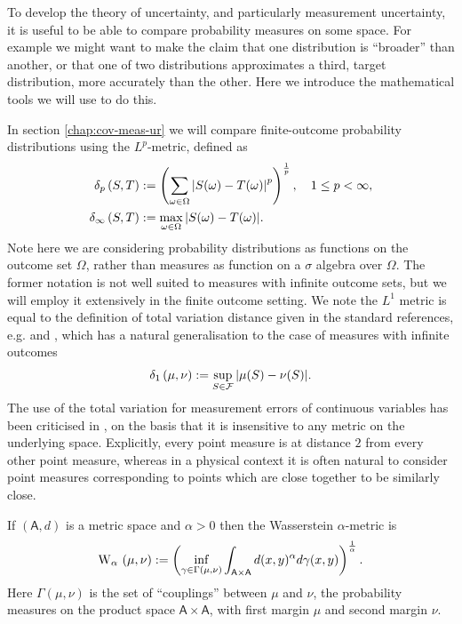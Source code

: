 To develop the theory of uncertainty, and particularly measurement uncertainty, it is useful to be able to compare probability measures on some space. For example we might want to make the claim that one distribution is ``broader'' than another, or that one of two distributions approximates a third, target distribution, more accurately than the other. Here we introduce the mathematical tools we will use to do this.

In section \ref{chap:cov-meas-ur} we will compare finite-outcome probability distributions using the $L^p$-metric, defined as
\begin{align}
  \label{eqn:lpvar-defn}
  \lPVar{S}{T}[p]&\defeq \left(\sum_{\omega\in\Omega} \abs{S(\omega) - T(\omega)}^p\right)^\frac{1}{p}, \quad 1\leq p < \infty,\\
  \lPVar{S}{T}[\infty] &\defeq \max_{\omega\in\Omega} \abs{S(\omega) - T(\omega)}.
\end{align}
Note here we are considering probability distributions as functions on the outcome set $\Omega$, rather than measures as function on a $\sigma$ algebra over $\Omega$. The former notation is not well suited to measures with infinite outcome sets, but we will employ it extensively in the finite outcome setting. We note the $L^1$ metric is equal to the definition of total variation distance given in the standard references, e.g. \cite{optimal-transport-villani} and \cite{topics-optimal-transport}, which has a natural generalisation to the case of measures with infinite outcomes
\begin{align}
  \lPVar{\mu}{\nu}[1] \defeq \sup_{S\in\fcal}\abs{\mu(S) - \nu(S)}.
\end{align}
The use of the total variation for measurement errors of continuous variables has been criticised in \cite{blw-meas-uncertainty}, on the basis that it is insensitive to any metric on the underlying space. Explicitly, every point measure is at distance $2$ from every other point measure, whereas in a physical context it is often natural to consider point measures corresponding to points which are close together to be similarly close.
\begin{defn}
  If $(\mathsf{A}, d)$ is  a metric space and $\alpha > 0$ then the Wasserstein $\alpha$-metric is
\begin{align}
  \ws{\mu,\nu}[\alpha]  \defeq \left(\inf_{\gamma\in\Gamma(\mu,\nu)} \int_{\mathsf{A}\times\mathsf{A}} d(x,y)^\alpha d\gamma(x,y)\right)^\frac{1}{\alpha}.\label{eq:wasserstein-prob-dists}
\end{align}
Here $\Gamma(\mu,\nu)$ is the set of ``couplings'' between $\mu$ and $\nu$, the probability measures on the product space $\mathsf{A}\times\mathsf{A}$, with first margin $\mu$ and second margin $\nu$.
\end{defn}
